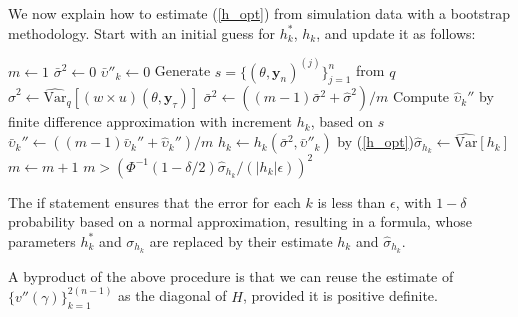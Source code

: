 \documentclass{article}
\begin{document}
We now explain how to estimate (\ref{h_opt}) from simulation data
with a bootstrap methodology. Start with an initial guess for
$h_k^*$, $h_k$, and update it as follows:
\begin{algorithmic}
\STATE $m\leftarrow 1$ \STATE $\bar\sigma^2\leftarrow 0$ \STATE
$\bar \upsilon''_k\leftarrow 0$ \REPEAT \STATE Generate
$s=\{(\theta,\mathbf{y}_{n})^{(j)}\}_{j=1}^n$ from
 $q$\STATE $\hat\sigma^2\leftarrow \widehat{\mathrm{Var}}_{q}[(w\times
u)(\theta,\mathbf{y}_{\tau})]$ \STATE $\bar\sigma^2\leftarrow
((m-1)\bar\sigma^2+\hat\sigma^2)/m$ \STATE Compute
$\hat\upsilon_{k}''$ by finite difference approximation with
increment $h_k$, based on $s$ \STATE $\bar \upsilon_{k}''\leftarrow
((m-1)\bar \upsilon_{k}''+\hat \upsilon_{k}'')/m$ \STATE
$h_k\leftarrow h_k(\bar\sigma^2,\bar \upsilon''_{k})$ by
(\ref{h_opt})\STATE $\hat\sigma_{ h_k}\leftarrow
\widehat{\mathrm{Var}}[h_k]$ \STATE $m\leftarrow m+1$ \UNTIL
$m>(\Phi^{-1}(1-\delta/2)\hat\sigma_{ h_k}/(| h_k|\epsilon))^2$
\end{algorithmic}The if statement ensures that the error for each $k$ is less than $\epsilon$,
with $1-\delta$ probability based on a normal approximation,
resulting in a formula, whose parameters $h_k^*$ and $\sigma_{h_k}$
are replaced by their estimate $h_k$ and $\hat\sigma_{h_k}$.

A byproduct of the above procedure is that we can reuse the estimate
of $\{v''(\gamma)\}_{k=1}^{2(n-1)}$ as the diagonal of $H$, provided
it is positive definite.
\end{document}
